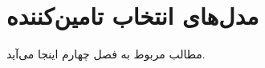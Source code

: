 \chapter{مدل‌های انتخاب تامین‌کننده}\label{Models}

مطالب مربوط به فصل چهارم اینجا می‌آید.















































